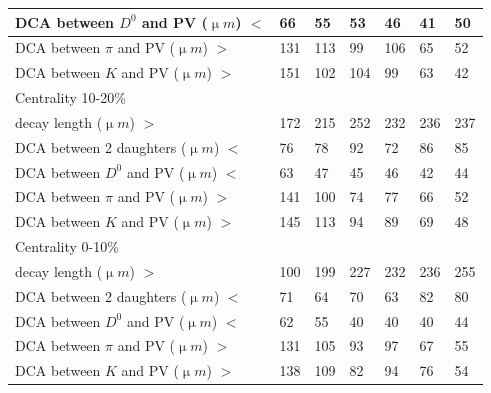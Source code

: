 \begin{table}[htp]
\begin{center}
\begin{tabular}{l|l|l|l|l|l|l}
      DCA between $D^0$ and PV (${\upmu}m$) $<$ & 66 & 55 & 53 & 46 & 41 & 50\\ \hline
      DCA between $\pi$ and PV (${\upmu}m$) $>$ & 131 & 113 & 99 & 106 & 65 & 52\\ \hline
      DCA between $K$ and PV (${\upmu}m$) $>$ & 151 & 102 & 104 & 99 & 63 & 42\\ \hline
      Centrality  10-20\% &  &  &  &  & & \\ \hline
      decay length (${\upmu}m$) $>$ & 172 & 215 & 252 & 232 & 236 & 237\\ \hline
      DCA between 2 daughters (${\upmu}m$) $<$ & 76 & 78 & 92 & 72 & 86 & 85\\ \hline
      DCA between $D^0$ and PV (${\upmu}m$) $<$ & 63 & 47 & 45 & 46 & 42 & 44\\ \hline
      DCA between $\pi$ and PV (${\upmu}m$) $>$ & 141 & 100 & 74 & 77 & 66 & 52\\ \hline
      DCA between $K$ and PV (${\upmu}m$) $>$ & 145 & 113 & 94 & 89 & 69 & 48\\ \hline
      Centrality  0-10\% &  &  &  &  & & \\ \hline
      decay length (${\upmu}m$) $>$ & 100 & 199 & 227 & 232 & 236 & 255\\ \hline
      DCA between 2 daughters (${\upmu}m$) $<$ & 71 & 64 & 70 & 63 & 82 & 80\\ \hline
      DCA between $D^0$ and PV (${\upmu}m$) $<$ & 62 & 55 & 40 & 40 & 40 & 44\\ \hline
      DCA between $\pi$ and PV (${\upmu}m$) $>$ & 131 & 105 & 93 & 97 & 67 & 55\\ \hline
      DCA between $K$ and PV (${\upmu}m$) $>$ & 138 & 109 & 82 & 94 & 76 & 54\\ \hline
    \end{tabular}
  \end{center}
\end{table}

